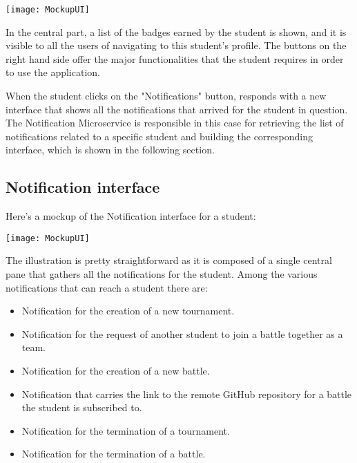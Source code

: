 \begin{center}
	\texttt{[image: MockupUI]}
\end{center}

In the central part, a list of the badges earned by the student is shown, and it is visible to all the users of \app navigating to this student's profile.
The buttons on the right hand side offer the major functionalities that the student requires in order to use the application.

When the student clicks on the "Notifications" button, \app responds with a new interface that shows all the notifications that arrived for the student in question. The Notification Microservice is responsible in this case for retrieving the list of notifications related to a specific student and building the corresponding interface, which is shown in the following section.


\begin{minipage}{\linewidth}
\subsection{Notification interface}
Here's a mockup of the Notification interface for a student:

\begin{center}
	\texttt{[image: MockupUI]}
\end{center}

\end{minipage}

The illustration is pretty straightforward as it is composed of a single central pane that gathers all the notifications for the student. Among the various notifications that can reach a student there are:
\begin{itemize}
	\item Notification for the creation of a new tournament.
	\item Notification for the request of another student to join a battle together as a team.
	\item Notification for the creation of a new battle.
	\item Notification that carries the link to the remote GitHub repository for a battle the student is subscribed to.
	\item Notification for the termination of a tournament.
	\item Notification for the termination of a battle.
\end{itemize}

